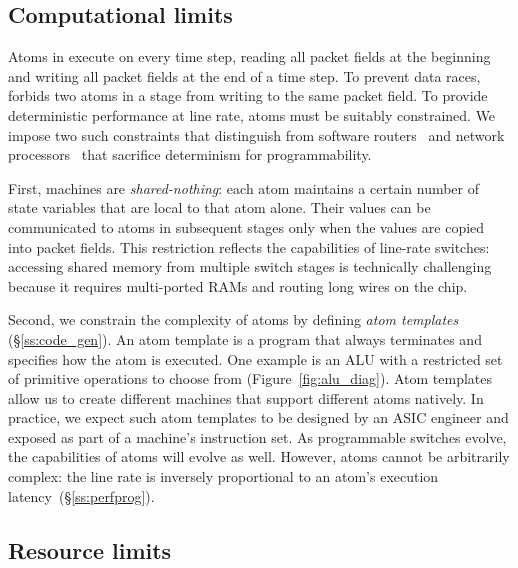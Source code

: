 \subsection{Computational limits}
\label{s:atomConstraints}

Atoms in \absmachine execute on every time step, reading all packet fields at
the beginning and writing all packet fields at the end of a time step. To
prevent data races, \absmachine forbids two atoms in a stage from writing to
the same packet field.  To provide deterministic performance at line rate,
atoms must be suitably constrained.  We impose two such constraints that
distinguish \absmachine from software routers~\cite{click} and network
processors~\cite{ixp4xx} that sacrifice determinism for programmability.

First, \absmachine machines are \textit{shared-nothing}: each atom maintains a
certain number of state variables that are local to that atom alone. Their
values can be communicated to atoms in subsequent stages only when the values
are copied into packet fields. This restriction reflects the capabilities of
line-rate switches: accessing shared memory from multiple switch stages is
technically challenging because it requires multi-ported RAMs and routing long
wires on the chip.

Second, we constrain the complexity of atoms by defining {\it atom templates}
(\S\ref{ss:code_gen}).  An atom template is a program that always terminates
and specifies how the atom is executed. One example is an ALU with a restricted
set of primitive operations to choose from (Figure~\ref{fig:alu_diag}). Atom
templates allow us to create different \absmachine machines that support
different atoms natively. In practice, we expect such atom templates to be
designed by an ASIC engineer and exposed as part of a \absmachine machine's
instruction set. As programmable switches evolve, the capabilities of atoms
will evolve as well. However, atoms cannot be arbitrarily complex: the line
rate is inversely proportional to an atom's execution
latency~(\S\ref{ss:perfprog}).

\subsection{Resource limits}


